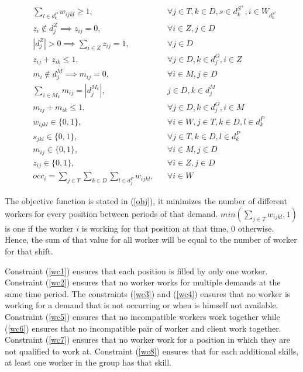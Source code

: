 \documentclass[../../thesis.tex]{subfiles}
\begin{document}
\begin{align}
    & \sum_{l \in d_k^P} w_{ijkl} \geq 1, && \forall j \in T, k \in D, s \in d^{S^+}_k, i \in W_{d^{S^+}_k} \label{wc8} \\
    & z_i \notin d^Z_j \implies z_{ij} = 0, && \forall i \in Z, j \in D \label{zc1}  \\
    & |d^Z_j| > 0 \implies \sum_{i \in Z} z_{ij} = 1, && \forall j \in D \label{zc2} \\
    & z_{ij} + z_{ik} \leq 1, && \forall j \in D, k \in d^O_j, i \in Z \label{zc3} \\
    & m_i \notin d^M_j \implies m_{ij} = 0, && \forall i \in M, j \in D  \label{mc1} \\
    & \sum_{i \in M_k} m_{ij} = |d^{M_k}_j|, && j \in D, k \in d^M_j  \label{mc2} \\
    & m_{ij} + m_{ik} \leq 1, && \forall j \in D, k \in d^O_j, i \in M  \label{mc3} \\
    & w_{ijkl} \in \{0, 1\}, && \forall i \in W, j \in T, k \in D, l \in d^P_k \label{binary1} \\
    & s_{jkl} \in \{0, 1\}, && \forall j \in T, k \in D, l \in d^P_k \label{binary4} \\
    & m_{ij} \in \{0, 1\}, && \forall i \in M, j \in D \label{binary2} \\ 
    & z_{ij} \in \{0, 1\}, && \forall i \in Z, j \in D \label{binary3} \\ 
    & occ_i = \sum_{j \in T} \sum_{k \in D} \sum_{l \in d^P_j} w_{ijkl}, && \forall i \in W \label{occ}
\end{align}
\endgroup

    
The objective function is stated in (\ref{obj}), it minimizes the number of different workers for every position between periods of that demand. $min(\sum_{j \in T} w_{ijkl}, 1)$ is one if the worker $i$ is working for that position at that time, 0 otherwise. Hence, the sum of that value for all worker will be equal to the number of worker for that shift.


Constraint (\ref{wc1}) ensures that each position is filled by only one worker. Constraint (\ref{wc2}) ensures that no worker works for multiple demands at the same time period. The constraints (\ref{wc3}) and (\ref{wc4}) ensures that no worker is working for a demand that is not occurring or when is himself not available. Constraint (\ref{wc5}) ensures that no incompatible workers work together while (\ref{wc6}) ensures that no incompatible pair of worker and client work together. Constraint (\ref{wc7}) ensures that no worker work for a position in which they are not qualified to work at. 
Constraint (\ref{wc8}) ensures that for each additional skills, at least one worker in the group has that skill.
\end{document}
